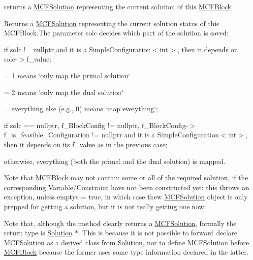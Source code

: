 returns a \mbox{\hyperlink{class_s_m_spp__di__unipi__it_1_1_m_c_f_solution}{M\+C\+F\+Solution}} representing the current solution of this \mbox{\hyperlink{class_s_m_spp__di__unipi__it_1_1_m_c_f_block}{M\+C\+F\+Block}} 

Returns a \mbox{\hyperlink{class_s_m_spp__di__unipi__it_1_1_m_c_f_solution}{M\+C\+F\+Solution}} representing the current solution status of this M\+C\+F\+Block.\+The parameter solc decides which part of the solution is saved\+:


\begin{DoxyItemize}
\item if solc != nullptr and it is a Simple\+Configuration$<$int$>$, then it depends on solc-\/$>$f\+\_\+value\+:

= 1 means \char`\"{}only map the primal solution\char`\"{}

= 2 means \char`\"{}only map the dual solution\char`\"{}

= everything else (e.\+g., 0) means \char`\"{}map everything\char`\"{};
\item if solc == nullptr, f\+\_\+\+Block\+Config != nullptr, f\+\_\+\+Block\+Config-\/$>$f\+\_\+is\+\_\+feasible\+\_\+\+Configuration != nullptr and it is a Simple\+Configuration$<$int$>$, then it depends on its f\+\_\+value as in the previous case;
\item otherwise, everything (both the primal and the dual solution) is mapped.
\end{DoxyItemize}

Note that \mbox{\hyperlink{class_s_m_spp__di__unipi__it_1_1_m_c_f_block}{M\+C\+F\+Block}} may not contain some or all of the required solution, if the corresponding Variable/\+Constraint have not been constructed yet\+: this throws an exception, unless emptys = true, in which case thew \mbox{\hyperlink{class_s_m_spp__di__unipi__it_1_1_m_c_f_solution}{M\+C\+F\+Solution}} object is only prepped for getting a solution, but it is not really getting one now.

Note that, although the method clearly returns a \mbox{\hyperlink{class_s_m_spp__di__unipi__it_1_1_m_c_f_solution}{M\+C\+F\+Solution}}, formally the return type is \mbox{\hyperlink{class_s_m_spp__di__unipi__it_1_1_solution}{Solution}} $\ast$. This is because it is not possible to forward declare \mbox{\hyperlink{class_s_m_spp__di__unipi__it_1_1_m_c_f_solution}{M\+C\+F\+Solution}} as a derived class from \mbox{\hyperlink{class_s_m_spp__di__unipi__it_1_1_solution}{Solution}}, nor to define \mbox{\hyperlink{class_s_m_spp__di__unipi__it_1_1_m_c_f_solution}{M\+C\+F\+Solution}} before \mbox{\hyperlink{class_s_m_spp__di__unipi__it_1_1_m_c_f_block}{M\+C\+F\+Block}} because the former uses some type information declared in the latter. 

